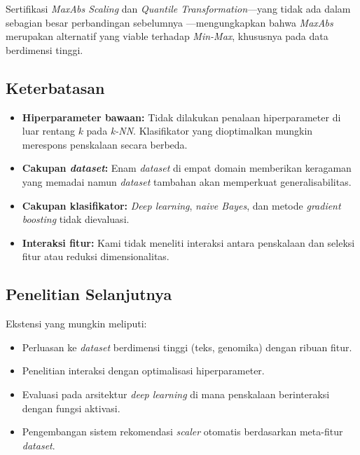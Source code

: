 \documentclass[12pt,a4paper]{article}
\begin{document}
Sertifikasi \textit{MaxAbs Scaling} dan \textit{Quantile Transformation}---yang
tidak ada dalam sebagian besar perbandingan sebelumnya
\cite{pagan2023scaling,henderi2021minmax,firmansyah2024stroke,pristyanto2022diabetes}---mengungkapkan
 bahwa \textit{MaxAbs} merupakan alternatif yang viable terhadap
\textit{Min-Max}, khususnya pada data berdimensi tinggi.

\subsection{Keterbatasan}
\label{sec:limitations}

\begin{itemize}
  \item \textbf{Hiperparameter bawaan:} Tidak dilakukan penalaan hiperparameter
  di luar rentang $k$ pada \textit{k-NN}. Klasifikator yang dioptimalkan mungkin
  merespons penskalaan secara berbeda.
  \item \textbf{Cakupan \textit{dataset}:} Enam \textit{dataset} di empat domain
  memberikan keragaman yang memadai namun \textit{dataset} tambahan akan
  memperkuat generalisabilitas.
  \item \textbf{Cakupan klasifikator:} \textit{Deep learning}, \textit{naive
  Bayes}, dan metode \textit{gradient boosting} tidak dievaluasi.
  \item \textbf{Interaksi fitur:} Kami tidak meneliti interaksi antara penskalaan
  dan seleksi fitur atau reduksi dimensionalitas.
\end{itemize}

\subsection{Penelitian Selanjutnya}
\label{sec:future}

Ekstensi yang mungkin meliputi:
\begin{itemize}
  \item Perluasan ke \textit{dataset} berdimensi tinggi (teks, genomika) dengan
  ribuan fitur.
  \item Penelitian interaksi dengan optimalisasi hiperparameter.
  \item Evaluasi pada arsitektur \textit{deep learning} di mana penskalaan
  berinteraksi dengan fungsi aktivasi.
  \item Pengembangan sistem rekomendasi \textit{scaler} otomatis berdasarkan
  meta-fitur \textit{dataset}.
\end{itemize}
\end{document}
